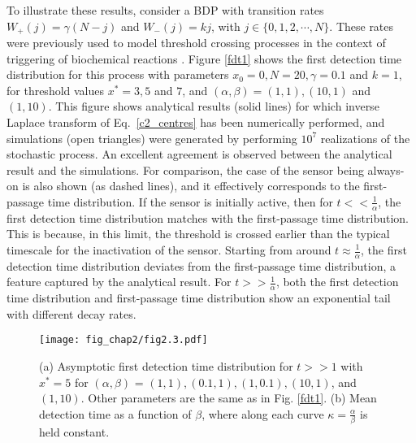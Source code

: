 To illustrate these results, consider a BDP with transition rates $W_{+}(j)= \gamma (N-j)$ and $W_{-}(j)= kj$, with $j \in \{0,1,2,\cdots,N\}$. These rates were previously used to model threshold crossing processes \cite{bdapprox} in the context of triggering of biochemical reactions \cite{greben1}. Figure \ref{fdt1} shows the first detection time distribution for this process with 
parameters $x_0=0, N=20, \gamma=0.1$ and $k=1$, for threshold values $x^* = 3,5$ and $7$, and 
$(\alpha,\beta)=(1,1),(10,1)$ and $(1,10)$. This figure shows analytical results (solid lines) for 
which inverse Laplace transform of Eq.~\ref{c2_centres} has been numerically performed, and 
simulations (open triangles) were generated by performing $10^7$ realizations of the stochastic process.
An excellent agreement is observed between the analytical result and the simulations.
For comparison, the case of the sensor being always-on is also shown (as dashed lines), and it effectively
corresponds to the first-passage time distribution.
If the sensor is initially active, then for $t << \frac{1}{\alpha}$, the first detection time distribution matches with the first-passage time distribution.
This is because, in this limit, the threshold is crossed earlier than the typical timescale for the inactivation of the sensor. Starting from around $t \approx \frac{1}{\alpha}$, the first detection time distribution deviates from the first-passage time distribution, a feature captured by the analytical result. For $t >> \frac{1}{\alpha}$, both the first detection time distribution and first-passage time distribution show an exponential tail with different decay rates. 



\begin{figure}
    \centering
    \texttt{[image: fig\_chap2/fig2.3.pdf]}
    \caption{(a) Asymptotic first detection time distribution for $t>>1$ with $x^*=5$ for $(\alpha,\beta)$ = $(1,1), (0.1,1), (1,0.1), (10,1)$, and $(1,10)$. Other parameters are the same as in Fig. \ref{fdt1}. (b) Mean detection time as a function of $\beta$, where along each curve $\kappa=\frac{\alpha}{\beta}$ is held constant.}
    \label{fdt2}
\end{figure}

